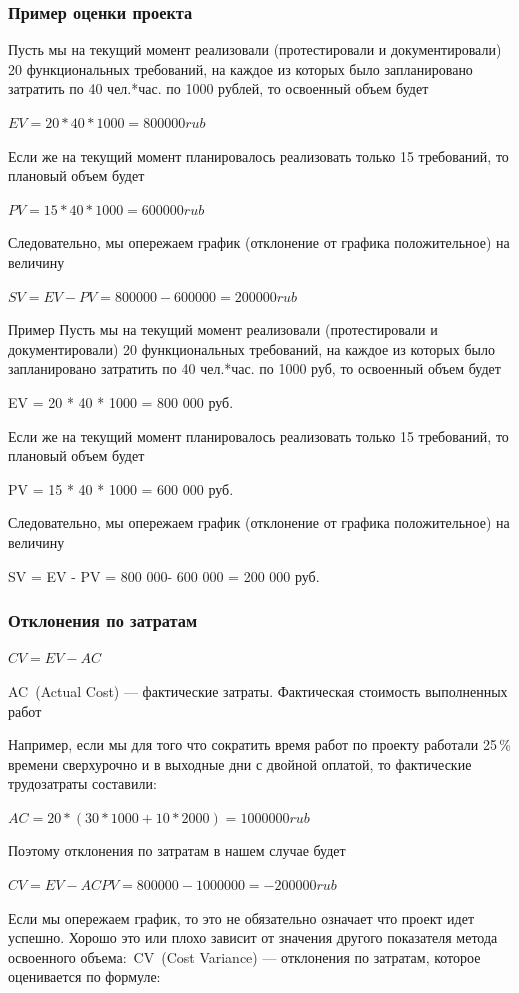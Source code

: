 \documentclass{../industrial-development}
\begin{document}
    \begin{frame} \frametitle{Пример оценки проекта}
        Пусть мы на текущий момент реализовали (протестировали и документировали) 20 функциональных требований, на каждое из которых было запланировано затратить по 40 чел.*час. по 1000 рублей, то освоенный объем будет
        \begin{center}
            $EV = 20 * 40 * 1000 = 800 000 rub$
        \end{center}
        Если же на текущий момент планировалось реализовать только 15 требований, то плановый объем будет
        \begin{center}
            $PV = 15 * 40 * 1000 = 600 000 rub$
        \end{center}
        Следовательно, мы опережаем график (отклонение от графика положительное) на величину
        \begin{center}
            $SV = EV - PV = 800 000- 600 000 = 200 000 rub$
        \end{center}
    \end{frame}
    \lecturenotes
Пример Пусть мы на текущий момент реализовали (протестировали и документировали) 20 функциональных требований, на каждое из которых было запланировано затратить по 40 чел.*час. по 1000 руб, то освоенный объем будет

EV = 20 * 40 * 1000 = 800 000 руб.

Если же на текущий момент планировалось реализовать только 15 требований, то плановый объем будет

PV = 15 * 40 * 1000 = 600 000 руб.

Следовательно, мы опережаем график (отклонение от графика положительное) на величину

SV = EV - PV = 800 000- 600 000 = 200 000 руб.

    \begin{frame} \frametitle{Отклонения по затратам}
        \begin{center}
            $CV = EV - AC$
        \end{center}
        \alert{AC} (Actual Cost) — фактические затраты. Фактическая стоимость выполненных работ

        Например, если мы для того что сократить время работ по проекту работали 25\,\% времени сверхурочно и в выходные дни с двойной оплатой, то фактические трудозатраты составили:
        \begin{center}
            $AC = 20 * (30 * 1000 + 10 * 2000) = 1 000 000 rub$
        \end{center}
        Поэтому отклонения по затратам в нашем случае будет
        \begin{center}
            $CV = EV - AC PV = 800 000 - 1 000 000 = - 200 000 rub$
        \end{center}
    \end{frame}
    \lecturenotes
    Если мы опережаем график, то это не обязательно означает что проект идет успешно. Хорошо это или плохо зависит от значения другого показателя метода освоенного объема: CV (Cost Variance) — отклонения по затратам, которое оценивается по формуле:
\end{document}
